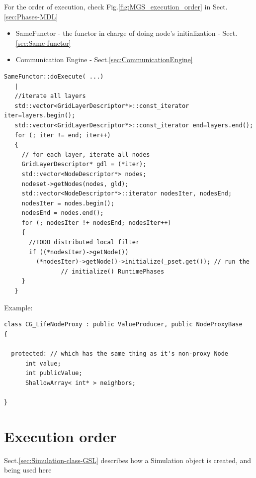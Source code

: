 For the order of execution, check Fig.\ref{fig:MGS_execution_order} in
Sect.\ref{sec:Phases-MDL}
\begin{itemize}
  \item SameFunctor - the functor in charge of doing node's initialization -
  Sect.\ref{sec:Same-functor}
  
  \item Communication Engine - Sect.\ref{sec:CommunicationEngine}
  
  
\end{itemize}

\begin{verbatim}
SameFunctor::doExecute( ...)
   |
   //iterate all layers
   std::vector<GridLayerDescriptor*>::const_iterator iter=layers.begin();
   std::vector<GridLayerDescriptor*>::const_iterator end=layers.end();
   for (; iter != end; iter++)
   {
     // for each layer, iterate all nodes
     GridLayerDescriptor* gdl = (*iter);
     std::vector<NodeDescriptor*> nodes;
     nodeset->getNodes(nodes, gld); 
     std::vector<NodeDescriptor*>::iterator nodesIter, nodesEnd;
     nodesIter = nodes.begin();
     nodesEnd = nodes.end();
     for (; nodesIter !+ nodesEnd; nodesIter++)
     {
       //TODO distributed local filter
       if ((*nodesIter)->getNode())
         (*nodesIter)->getNode()->initialize(_pset.get()); // run the
                // initialize() RuntimePhases
     }
   }
\end{verbatim}


Example:
\begin{lstlisting}
class CG_LifeNodeProxy : public ValueProducer, public NodeProxyBase
{

  protected: // which has the same thing as it's non-proxy Node
      int value;
      int publicValue;
      ShallowArray< int* > neighbors;

}
\end{lstlisting}



\section{Execution order}
\label{sec:MGS-execution-order}

Sect.\ref{sec:Simulation-class-GSL} describes how a Simulation object is created, and 
being used here


